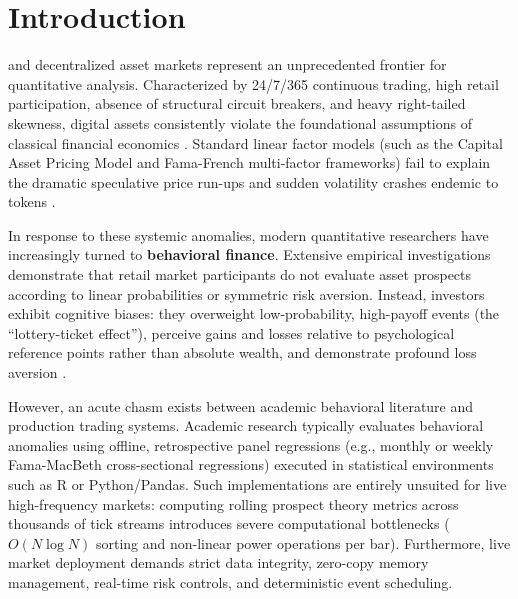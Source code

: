 \documentclass[10pt,journal,compsoc]{IEEEtran}
\begin{document}
\maketitle
\IEEEdisplaynontitleabstractindextext
\IEEEpeerreviewmaketitle

\section{Introduction}
 and decentralized asset markets represent an unprecedented frontier for quantitative analysis. Characterized by 24/7/365 continuous trading, high retail participation, absence of structural circuit breakers, and heavy right-tailed skewness, digital assets consistently violate the foundational assumptions of classical financial economics \cite{fama1970efficient, markowitz1952portfolio}. Standard linear factor models (such as the Capital Asset Pricing Model and Fama-French multi-factor frameworks) fail to explain the dramatic speculative price run-ups and sudden volatility crashes endemic to tokens \cite{barberis2013thirty}.

In response to these systemic anomalies, modern quantitative researchers have increasingly turned to \textbf{behavioral finance}. Extensive empirical investigations demonstrate that retail market participants do not evaluate asset prospects according to linear probabilities or symmetric risk aversion. Instead, investors exhibit cognitive biases: they overweight low-probability, high-payoff events (the ``lottery-ticket effect''), perceive gains and losses relative to psychological reference points rather than absolute wealth, and demonstrate profound loss aversion \cite{tversky1992advances, yadav2023behavioral}.

However, an acute chasm exists between academic behavioral literature and production trading systems. Academic research typically evaluates behavioral anomalies using offline, retrospective panel regressions (e.g., monthly or weekly Fama-MacBeth cross-sectional regressions) executed in statistical environments such as R or Python/Pandas. Such implementations are entirely unsuited for live high-frequency markets: computing rolling prospect theory metrics across thousands of tick streams introduces severe computational bottlenecks ($O(N \log N)$ sorting and non-linear power operations per bar). Furthermore, live market deployment demands strict data integrity, zero-copy memory management, real-time risk controls, and deterministic event scheduling.
\end{document}
